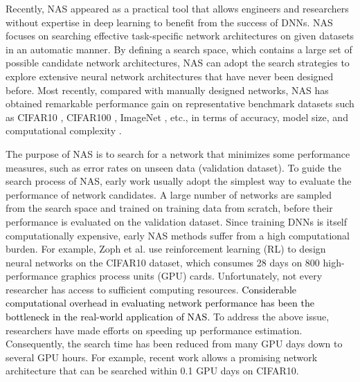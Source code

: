 \documentclass[journal]{IEEEtran}
\begin{document}
Recently, NAS appeared as a practical tool that allows engineers and researchers without expertise in deep learning to benefit from the success of DNNs. NAS focuses on searching effective task-specific network architectures on given datasets in an automatic manner. By defining a search space, which contains a large set of possible candidate network architectures, NAS can adopt the search strategies to explore extensive neural network architectures that have never been designed before. Most recently, compared with manually designed networks, NAS has obtained remarkable performance gain on representative benchmark datasets such as CIFAR10 \cite{krizhevsky2009learning}, CIFAR100 \cite{krizhevsky2009learning}, ImageNet \cite{deng2009imagenet}, etc., in terms of accuracy, model size, and computational complexity \cite{tan2019mnasnet, dong2019searching, zhang2020one, cai2018proxylessnas, lu2020neural}.

The purpose of NAS is to search for a network that minimizes some performance measures, such as error rates on unseen data (validation dataset). To guide the search process of NAS, early work \cite{baker2016designing, zoph2018learning, real2017large, real2019aging} usually adopt the simplest way to evaluate the performance of network candidates. A large number of networks are sampled from the search space and trained on training data from scratch, before their performance is evaluated on the validation dataset. Since training DNNs is itself computationally expensive, early NAS methods suffer from a high computational burden. For example, Zoph et al. \cite{baker2016designing} use reinforcement learning (RL) to design neural networks on the CIFAR10 dataset, which consumes 28 days on 800 high-performance graphics process units (GPU) cards. Unfortunately, not every researcher has access to sufficient computing resources. \textcolor{black}{Considerable computational overhead in evaluating network performance has been the bottleneck in the real-world application of NAS.} To address the above issue, researchers have made efforts on speeding up performance estimation. Consequently, the search time has been reduced from many GPU days down to several GPU hours. For example, recent work \cite{xu2021partially} allows a promising network architecture that can be searched within 0.1 GPU days on CIFAR10. 
\end{document}
